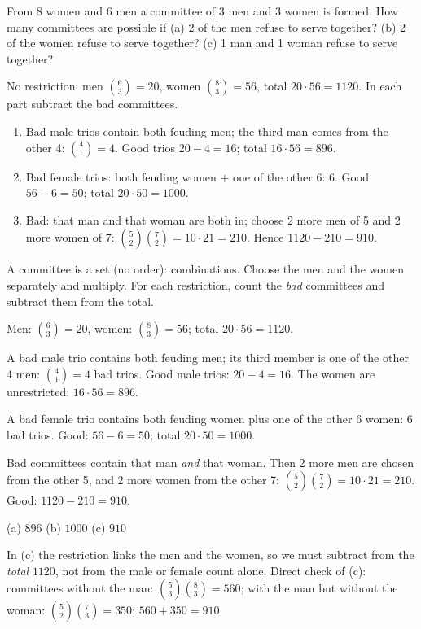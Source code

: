 
\begin{problem}
	From 8 women and 6 men a committee of 3 men and 3 women is formed. How many
	committees are possible if (a) 2 of the men refuse to serve together?
	(b) 2 of the women refuse to serve together? (c) 1 man and 1 woman refuse
	to serve together?
\end{problem}

\begin{slides}
	\small
	\exstatement
	\pause
	\sol No restriction: men $\binom63=20$, women $\binom83=56$, total
	$20\cdot 56 = 1120$. In each part subtract the bad committees.
	\begin{enumerate}
		\item[(a)] Bad male trios contain both feuding men; the third man comes
		      from the other 4: $\binom41=4$. Good trios $20-4=16$; total
		      $16\cdot 56 = 896$.
		\item[(b)] Bad female trios: both feuding women $+$ one of the other 6:
		      $6$. Good $56-6=50$; total $20\cdot 50 = 1000$.
		\item[(c)] Bad: that man and that woman are both in; choose 2 more men of
		      5 and 2 more women of 7: $\binom52\binom72=10\cdot21 = 210$. Hence
		      $1120-210 = 910$.
	\end{enumerate}
\end{slides}

\begin{solution}
	\idea A committee is a set (no order): combinations. Choose the men and the
	women separately and multiply. For each restriction, count the \emph{bad}
	committees and subtract them from the total.

	 Men: $\binom63=20$, women: $\binom83=56$; total
	$20\cdot56 = 1120$.

	 A bad male trio contains both feuding men; its third member is one
	of the other 4 men: $\binom41=4$ bad trios. Good male trios: $20-4=16$. The
	women are unrestricted: $16\cdot56 = 896$.

	 A bad female trio contains both feuding women plus one of the
	other 6 women: $6$ bad trios. Good: $56-6=50$; total $20\cdot50=1000$.

	 Bad committees contain that man \emph{and} that woman. Then 2
	more men are chosen from the other 5, and 2 more women from the other 7:
	$\binom52\binom72 = 10\cdot21 = 210$. Good: $1120-210=910$.

	\begin{answer}
		(a) $896$ \quad (b) $1000$ \quad (c) $910$
	\end{answer}
	\begin{remark}
		In (c) the restriction links the men and the women, so we must subtract
		from the \emph{total} $1120$, not from the male or female count alone.
		Direct check of (c): committees without the man: $\binom53\binom83=560$;
		with the man but without the woman: $\binom52\binom73=350$;
		$560+350=910$.
	\end{remark}
\end{solution}
